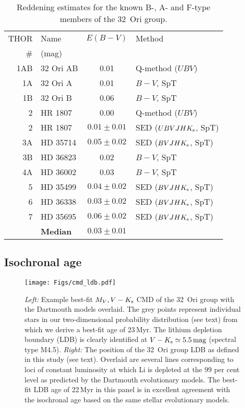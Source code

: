 \documentclass[usenatbib]{mnras}
\begin{document}
\begin{table}
\caption[]{Reddening estimates for the known B-, A- and F-type members of the 32~Ori group. \label{tab:red}}
\begin{tabular}{r l c l}
\hline
THOR & Name      & $E(B-V)$ & Method\\
      \#    & (mag)    &       \\
\hline
1AB & 32 Ori AB & 0.01  & Q-method ($UBV$)\\
1A & 32 Ori A  & 0.01  & $B-V$, SpT\\
1B & 32 Ori B  & 0.06  & $B-V$, SpT\\
2 & HR 1807  & 0.00  & Q-method ($UBV$)\\
2 & HR 1807  & $0.01\pm0.01$ & SED ($UBVJHK_{\rm{s}}$, SpT) \\
3A & HD 35714  & $0.05\pm0.02$ & SED ($BVJHK_{\rm{s}}$, SpT)\\
3B & HD 36823  &  0.02  &  $B-V$, SpT\\
4A & HD 36002  &  0.03  &  $B-V$, SpT\\
5 & HD 35499  & $0.04\pm0.02$ & SED ($BVJHK_{\rm{s}}$, SpT)\\
6 & HD 36338  & $0.03\pm0.02$ & SED ($BVJHK_{\rm{s}}$, SpT)\\
7 & HD 35695  & $0.06\pm0.02$ & SED ($BVJHK_{\rm{s}}$, SpT)\\
\hline
& {\bf Median} & {\boldmath$0.03\pm0.01$} & \\
\hline
\end{tabular}
\end{table}

\subsection{Isochronal age}
\label{iso}

\begin{figure*}
\centering \texttt{[image: Figs/cmd\_ldb.pdf]}
\caption[]{\emph{Left:} Example best-fit $M_{V}, V-K_{\rm{s}}$ CMD of
  the 32~Ori group with the Dartmouth models overlaid. The grey points
  represent individual stars in our two-dimensional probability
  distribution (see text) from which we derive a best-fit age of
  23\,Myr. The lithium depletion boundary (LDB) is clearly identified
  at $V-K_{\rm{s}} \simeq 5.5\,\rm{mag}$ (spectral type M4.5).
  \emph{Right:} The position of the 32~Ori group LDB as
  defined in this study (see text). Overlaid are several lines
  corresponding to loci of constant luminosity at which Li is depleted
  at the 99 per cent level as predicted by the Dartmouth evolutionary
  models.  The best-fit LDB age of 22\,Myr in this panel is in
  excellent agreement with the isochronal age based on the same
  stellar evolutionary models.}
\label{fig:cmd_ldb}
\end{figure*}
\end{document}
